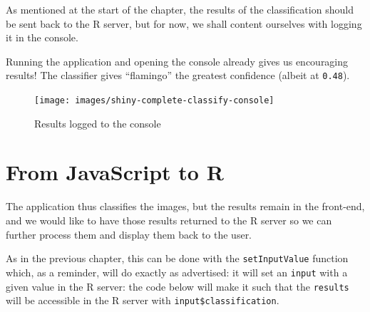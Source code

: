 \documentclass[10pt,]{krantz}
\begin{document}
As mentioned at the start of the chapter, the results of the classification should be sent back to the R server, but for now, we shall content ourselves with logging it in the console.

Running the application and opening the console already gives us encouraging results! The classifier gives ``flamingo'' the greatest confidence (albeit at \texttt{0.48}).

\begin{figure}[H]

{\centering \texttt{[image: images/shiny-complete-classify-console]} 

}

\caption{Results logged to the console}\label{fig:shiny-complete-classify-console}
\end{figure}

\hypertarget{shiny-complete-js2r}{%
\section{From JavaScript to R}\label{shiny-complete-js2r}}

The application thus classifies the images, but the results remain in the front-end, and we would like to have those results returned to the R server so we can further process them and display them back to the user.

As in the previous chapter, this can be done with the \texttt{setInputValue} function which, as a reminder, will do exactly as advertised: it will set an \texttt{input} with a given value in the R server: the code below will make it such that the \texttt{results} will be accessible in the R server with \texttt{input\$classification}.
\end{document}
